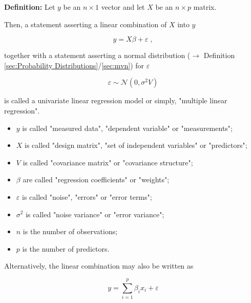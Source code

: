 \documentclass[a4paper,12pt,twoside]{book}
\begin{document}
\textbf{Definition:} Let $y$ be an $n \times 1$ vector and let $X$ be an $n \times p$ matrix.

Then, a statement asserting a linear combination of $X$ into $y$

\begin{equation} \label{eq:mlr-mlr-model}
y = X\beta + \varepsilon \; ,
\end{equation}

together with a statement asserting a normal distribution ($\rightarrow$ Definition \ref{sec:Probability Distributions}/\ref{sec:mvn}) for $\varepsilon$

\begin{equation} \label{eq:mlr-mlr-noise}
\varepsilon \sim \mathcal{N}(0, \sigma^2 V)
\end{equation}

is called a univariate linear regression model or simply, "multiple linear regression".

\begin{itemize}

\item $y$ is called "measured data", "dependent variable" or "measurements";

\item $X$ is called "design matrix", "set of independent variables" or "predictors";

\item $V$ is called "covariance matrix" or "covariance structure";

\item $\beta$ are called "regression coefficients" or "weights";

\item $\varepsilon$ is called "noise", "errors" or "error terms";

\item $\sigma^2$ is called "noise variance" or "error variance";

\item $n$ is the number of observations;

\item $p$ is the number of predictors.

\end{itemize}

Alternatively, the linear combination may also be written as

\begin{equation} \label{eq:mlr-mlr-model-sum}
y = \sum_{i=1}^{p} \beta_i x_i + \varepsilon
\end{equation}
\end{document}
